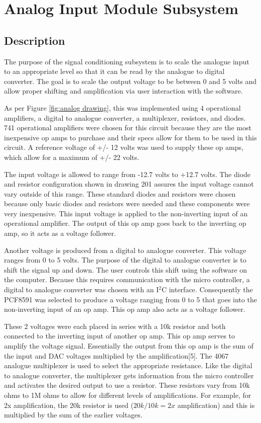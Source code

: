 \section[Analog Input]{Analog Input Module Subsystem}
\subsection{Description}
The purpose of the signal conditioning subsystem is to scale the analogue input
 to an appropriate level so that it can be read by the analogue to digital 
converter. The goal is to scale the output voltage to be between 0 and 5 volts 
and allow proper shifting and amplification via user interaction with the 
software. 

As per Figure \ref{fig:analog drawing}, this was implemented using 4 operational amplifiers, a digital to analogue converter, a multiplexer, resistors, and diodes. 741 operational amplifiers were chosen for this circuit because they are the most inexpensive op amps to purchase and their specs allow for them to be used in this circuit. A reference voltage of +/- 12 volts was used to supply these op amps, which allow for a maximum of +/- 22 volts\cite{ds:741 op amp}.

The input voltage is allowed to range from -12.7 volts to +12.7 volts. The 
diode and resistor configuration shown in drawing 201 assures the input voltage cannot vary outside of this range. These standard diodes and resistors were chosen because only basic diodes and resistors were needed and these components were very inexpensive. This input voltage is applied to the non-inverting input of an operational amplifier. The output of this op amp goes back to the inverting op amp, so it acts as a voltage follower\cite{bk:olia}.

Another voltage is produced from a digital to analogue converter. This voltage
 ranges from 0 to 5 volts. The purpose of the digital to analogue converter is
 to shift the signal up and down. The user controls this shift using the
 software on the computer. Because this requires communication with the micro
 controller, a digital to analogue converter was chosen with an 
I$^2$C interface. Consequently the PCF8591 was selected to 
produce a voltage ranging from 0 to 5 that goes into the non-inverting input 
of an op amp. This op amp also acts as a voltage follower.

These 2 voltages were each placed in series with a 10k resistor and both 
connected to the inverting input of another op amp. This op amp serves to 
amplify the voltage signal. Essentially the output from this op amp is the sum
 of the input and DAC voltages multiplied by the amplification[5]. The 4067
 analogue multiplexer is used to select the appropriate resistance. Like the 
digital to analogue converter, the multiplexer gets information from the micro
 controller and activates the desired output to use a resistor. These
 resistors vary from 10k ohms to 1M ohms to allow for different levels of 
amplifications. For example, for 2x amplification, the 20k resistor is used 
($20k/10k = 2x$ amplification) and this is multiplied by the sum of the 
earlier voltages\cite{bk:olia}.

